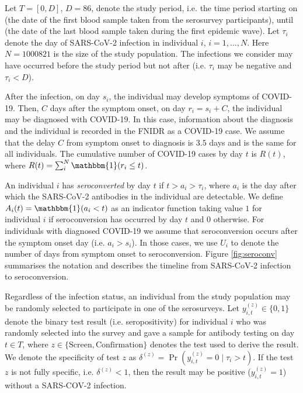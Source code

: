 \documentclass[aoas]{imsart}
\begin{document}
Let $T = [0, D]$, $D = 86$, denote the study period, i.e. the time period starting on  (the date of the first blood sample taken from the serosurvey participants), until  (the date of the last blood sample taken during the first epidemic wave). Let $\tau_i$ denote the day of SARS-CoV-2 infection in individual $i$, $i = 1, ..., N$. Here $N = 1000821$ is the size of the study population. The infections we consider may have occurred before the study period but not after (i.e. $\tau_i$ may be negative and $\tau_i < D$).

After the infection, on day $s_i$, the individual may develop symptoms of COVID-19. Then, $C$ days after the symptom onset, on day $r_i = s_i + C$, the individual may be diagnosed with COVID-19. In this case, information about the diagnosis and the individual is recorded in the FNIDR as a COVID-19 case. We assume that the delay $C$ from symptom onset to diagnosis is $3.5$ days and is the same for all individuals. The cumulative number of COVID-19 cases by day $t$ is $R(t)$, where $R (t) = \sum_i^N \mathbbm{1}(r_i \leq t)$.

An individual $i$ has \emph{seroconverted} by day $t$ if $t > a_i > \tau_i$, where $a_i$ is the day after which the SARS-CoV-2 antibodies in the individual are detectable. We define $A_i(t) = \mathbbm{1}(a_i < t)$ as an indicator function taking value $1$ for individual $i$ if seroconversion has occurred by day $t$ and $0$ otherwise. For individuals with diagnosed COVID-19 we assume that seroconversion occurs after the symptom onset day (i.e. $a_i > s_i$). In those cases, we use $U_i$ to denote the number of days from symptom onset to seroconversion. Figure \ref{fig:seroconv} summarises the notation and describes the timeline from SARS-CoV-2 infection to seroconversion. 

Regardless of the infection status, an individual from the study population may be randomly selected to participate in one of the serosurveys. Let $y^{(z)}_{i,t} \in \{0, 1\}$ denote the binary test result (i.e. seropositivity) for individual $i$ who was randomly selected into the survey and gave a sample for antibody testing on day $t \in T$, where $z \in \{\text{Screen}, \text{Confirmation}\}$ denotes the test used to derive the result. We denote the specificity of test $z$ as $\delta^{(z)} = \Pr(y^{(z)}_{i,t} = 0 \mid \tau_i > t)$. If the test $z$ is not fully specific, i.e. $\delta^{(z)} < 1$, then the result may be positive ($y^{(z)}_{i,t} = 1$) without a SARS-COV-2 infection. 
\end{document}
